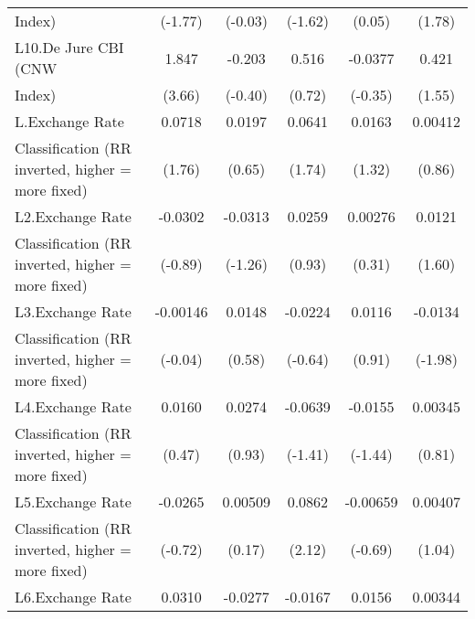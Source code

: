 {\begin{tabular}{l*{5}{c}}
Index)              &     (-1.77)         &     (-0.03)         &     (-1.62)         &      (0.05)         &      (1.78)         \\
[1em]
L10.De Jure CBI (CNW&       1.847\sym{***}&      -0.203         &       0.516         &     -0.0377         &       0.421         \\
Index)              &      (3.66)         &     (-0.40)         &      (0.72)         &     (-0.35)         &      (1.55)         \\
[1em]
L.Exchange Rate     &      0.0718         &      0.0197         &      0.0641         &      0.0163         &     0.00412         \\
Classification (RR inverted, higher = more fixed)&      (1.76)         &      (0.65)         &      (1.74)         &      (1.32)         &      (0.86)         \\
[1em]
L2.Exchange Rate    &     -0.0302         &     -0.0313         &      0.0259         &     0.00276         &      0.0121         \\
Classification (RR inverted, higher = more fixed)&     (-0.89)         &     (-1.26)         &      (0.93)         &      (0.31)         &      (1.60)         \\
[1em]
L3.Exchange Rate    &    -0.00146         &      0.0148         &     -0.0224         &      0.0116         &     -0.0134\sym{*}  \\
Classification (RR inverted, higher = more fixed)&     (-0.04)         &      (0.58)         &     (-0.64)         &      (0.91)         &     (-1.98)         \\
[1em]
L4.Exchange Rate    &      0.0160         &      0.0274         &     -0.0639         &     -0.0155         &     0.00345         \\
Classification (RR inverted, higher = more fixed)&      (0.47)         &      (0.93)         &     (-1.41)         &     (-1.44)         &      (0.81)         \\
[1em]
L5.Exchange Rate    &     -0.0265         &     0.00509         &      0.0862\sym{*}  &    -0.00659         &     0.00407         \\
Classification (RR inverted, higher = more fixed)&     (-0.72)         &      (0.17)         &      (2.12)         &     (-0.69)         &      (1.04)         \\
[1em]
L6.Exchange Rate    &      0.0310         &     -0.0277         &     -0.0167         &      0.0156         &     0.00344         \\

\end{tabular}}
